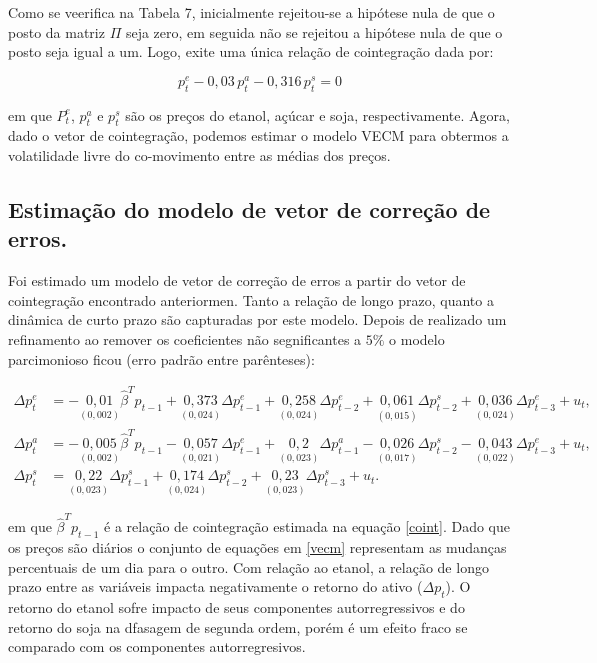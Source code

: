 Como se veerifica na Tabela 7, inicialmente rejeitou-se a hipótese nula
de que o posto da matriz \(\Pi\) seja zero, em seguida não se rejeitou a
hipótese nula de que o posto seja igual a um. Logo, exite uma única
relação de cointegração dada por:

\begin{equation}\label{coint}
p_t^e-0,03\,p_t^a-0,316\,p_t^s=0
\end{equation}

em que \(P_t^e\), \(p_t^a\) e \(p_t^s\) são os preços do etanol, açúcar
e soja, respectivamente. Agora, dado o vetor de cointegração, podemos
estimar o modelo VECM para obtermos a volatilidade livre do co-movimento
entre as médias dos preços.

\subsection{Estimação do modelo de vetor de correção de
erros.}\label{estimacao-do-modelo-de-vetor-de-correcao-de-erros.}

Foi estimado um modelo de vetor de correção de erros a partir do vetor
de cointegração encontrado anteriormen. Tanto a relação de longo prazo,
quanto a dinâmica de curto prazo são capturadas por este modelo. Depois
de realizado um refinamento ao remover os coeficientes não segnificantes
a \(5\%\) o modelo parcimonioso ficou (erro padrão entre parênteses):

\begin{align}\label{vecm}
\Delta p_t^e &=-\underset{(0,002)}{0,01}\hat{\beta}^Tp_{t-1}+\underset{(0,024)}{0,373}\Delta p_{t-1}^e+\underset{(0,024)}{0,258}\Delta p_{t-2}^e+\underset{(0,015)}{0,061}\Delta p^s_{t-2}+\underset{(0,024)}{0,036}\Delta p^e_{t-3}+u_t,\nonumber\\
\Delta p_t^a &=-\underset{(0,002)}{0,005}\hat{\beta}^Tp_{t-1}-\underset{(0,021)}{0,057}\Delta p^e_{t-1}+\underset{(0,023)}{0,2}\Delta p^a_{t-1}-\underset{(0,017)}{0,026}\Delta p_{t-2}^s-\underset{(0,022)}{0,043}\Delta p_{t-3}^e+u_t,\\
\Delta p_t^s &=\underset{(0,023)}{0,22}\Delta p_{t-1}^s+\underset{(0,024)}{0,174}\Delta p_{t-2}^s+\underset{(0,023)}{0,23}\Delta p_{t-3}^s+u_t.\nonumber
\end{align}

em que \(\hat{\beta}^Tp_{t-1}\) é a relação de cointegração estimada na
equação \eqref{coint}. Dado que os preços são diários o conjunto de
equações em \eqref{vecm} representam as mudanças percentuais de um dia
para o outro. Com relação ao etanol, a relação de longo prazo entre as
variáveis impacta negativamente o retorno do ativo (\(\Delta p_t\)). O
retorno do etanol sofre impacto de seus componentes autorregressivos e
do retorno do soja na dfasagem de segunda ordem, porém é um efeito fraco
se comparado com os componentes autorregresivos.

